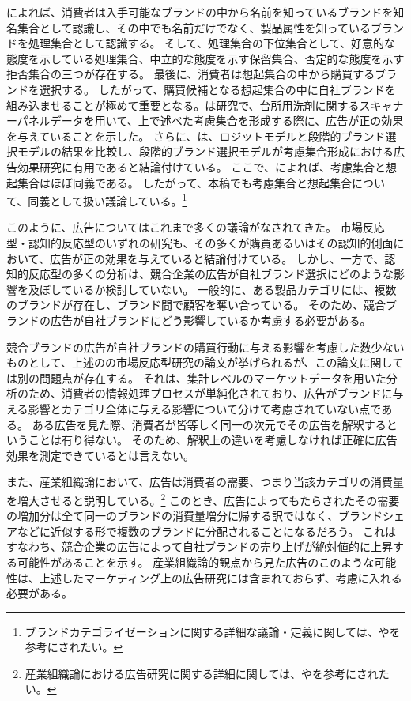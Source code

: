 \documentclass[11pt]{jsarticle}
\begin{document}
\newpage

\citet{brisoux1980}によれば、消費者は入手可能なブランドの中から名前を知っているブランドを知名集合として認識し、その中でも名前だけでなく、製品属性を知っているブランドを処理集合として認識する。
そして、処理集合の下位集合として、好意的な態度を示している処理集合、中立的な態度を示す保留集合、否定的な態度を示す拒否集合の三つが存在する。
最後に、消費者は想起集合の中から購買するブランドを選択する。
したがって、購買候補となる想起集合の中に自社ブランドを組み込ませることが極めて重要となる。\citet{saito1999}は研究で、台所用洗剤に関するスキャナーパネルデータを用いて、上で述べた考慮集合を形成する際に、広告が正の効果を与えていることを示した。
さらに、\citet{saito1999}は、ロジットモデルと段階的ブランド選択モデルの結果を比較し、段階的ブランド選択モデルが考慮集合形成における広告効果研究に有用であると結論付けている。
ここで、\citet{urano2012}によれば、考慮集合と想起集合はほぼ同義である。
したがって、本稿でも考慮集合と想起集合について、同義として扱い議論している。\footnote{ブランドカテゴライゼーションに関する詳細な議論・定義に関しては、\citet{onzo1995}や\citet{katsumata2011}を参考にされたい。}

このように、広告についてはこれまで多くの議論がなされてきた。
市場反応型・認知的反応型のいずれの研究も、その多くが購買あるいはその認知的側面において、広告が正の効果を与えていると結論付けている。
しかし、一方で、認知的反応型の多くの分析は、競合企業の広告が自社ブランド選択にどのような影響を及ぼしているか検討していない。
一般的に、ある製品カテゴリには、複数のブランドが存在し、ブランド間で顧客を奪い合っている。
そのため、競合ブランドの広告が自社ブランドにどう影響しているか考慮する必要がある。

競合ブランドの広告が自社ブランドの購買行動に与える影響を考慮した数少ないものとして、上述の\citet{shimizu1990}の市場反応型研究の論文が挙げられるが、この論文に関しては別の問題点が存在する。
それは、集計レベルのマーケットデータを用いた分析のため、消費者の情報処理プロセスが単純化されており、広告がブランドに与える影響とカテゴリ全体に与える影響について分けて考慮されていない点である。
ある広告を見た際、消費者が皆等しく同一の次元でその広告を解釈するということは有り得ない。
そのため、解釈上の違いを考慮しなければ正確に広告効果を測定できているとは言えない。

また、産業組織論において、広告は消費者の需要、つまり当該カテゴリの消費量を増大させると説明している。\footnote{産業組織論における広告研究に関する詳細に関しては、\citet{uekusa2013}や\citet{nagaoka2013}を参考にされたい。}
このとき、広告によってもたらされたその需要の増加分は全て同一のブランドの消費量増分に帰する訳ではなく、ブランドシェアなどに近似する形で複数のブランドに分配されることになるだろう。
これはすなわち、競合企業の広告によって自社ブランドの売り上げが絶対値的に上昇する可能性があることを示す。
産業組織論的観点から見た広告のこのような可能性は、上述したマーケティング上の広告研究には含まれておらず、考慮に入れる必要がある。
\end{document}
